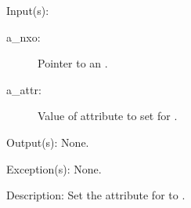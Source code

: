 \begin{capi}
\begin{capilist}
	\item[Input(s): ]
		\begin{description}\item[]
		\item[a\_nxo: ]
			Pointer to an .
		\item[a\_attr: ]
			Value of attribute to set for .
		\end{description}
	\item[Output(s): ] None.
	\item[Exception(s): ] None.
	\item[Description: ]
		Set the attribute for  to .
	\end{capilist}
\end{capi}
